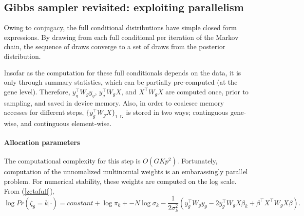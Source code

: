 



\subsection{Gibbs sampler revisited: exploiting parallelism}
\label{subsec:gibbs-revisited}
Owing to conjugacy, the full conditional distributions have simple closed form expressions. By drawing from each full conditional per iteration of the Markov chain, the sequence of draws converge to a set of draws from the posterior distribution.

Insofar as the computation for these full conditionals depends on the data, it is only through summary statistics, which can be partially pre-computed (at the gene level). Therefore, $y_g^\top W_g y_g$, $y_g^\top W_g X$, and $X^\top W_g X$ are computed once, prior to sampling, and saved in device memory. Also, in order to coalesce memory accesses for different steps, $\{y_g^\top W_g X\}_{1:G}$ is stored in two ways; continguous gene-wise, and continguous
element-wise.

\paragraph{Allocation parameters}
The computational complexity for this step is $O(GKp^2)$. Fortunately, computation of the unnomalized multinomial weights is an embarassingly parallel problem. For numerical stability, these weights are computed on the log scale. From (\ref{zetafull}),
\begin{equation}
\label{logweight}
\log Pr(\zeta_g=k|\cdot) = constant + \log \pi_k + -N \log \sigma_k - \frac{1}{2\sigma^2_k}\left(y_g^\top W_g y_g - 2y_g^\top W_g X \beta_k + \beta^\top X^\top W_g X \beta \right).
\end{equation}

